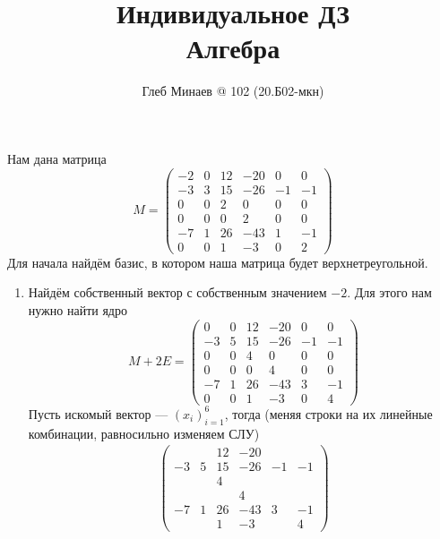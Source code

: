 \documentclass[12pt,a4paper]{article}
\title{Индивидуальное ДЗ\\Алгебра}
\author{Глеб Минаев @ 102 (20.Б02-мкн)}
\begin{document}
    \maketitle

    \begin{problem*}
        Нам дана матрица
        \[
            M =
            \begin{pmatrix}
                -2& 0& 12& -20& 0& 0\\
                -3& 3& 15& -26& -1& -1\\
                0& 0& 2& 0& 0& 0\\
                0& 0& 0& 2& 0& 0\\
                -7& 1& 26& -43& 1& -1\\
                0& 0& 1& -3& 0& 2
            \end{pmatrix}
        \]
        Для начала найдём базис, в котором наша матрица будет верхнетреугольной.
        \begin{enumerate}
            \item Найдём собственный вектор с собственным значением $-2$. Для этого нам нужно найти ядро
                \[
                    M + 2E =
                    \begin{pmatrix}
                        0& 0& 12& -20& 0& 0\\
                        -3& 5& 15& -26& -1& -1\\
                        0& 0& 4& 0& 0& 0\\
                        0& 0& 0& 4& 0& 0\\
                        -7& 1& 26& -43& 3& -1\\
                        0& 0& 1& -3& 0& 4
                    \end{pmatrix}
                \]
                Пусть искомый вектор --- $(x_i)_{i=1}^6$, тогда (меняя строки на их линейные комбинации, равносильно изменяем СЛУ)
                \begin{align*}
                    \begin{pmatrix}
                        & & 12& -20& & \\
                        -3& 5& 15& -26& -1& -1\\
                        & & 4& & & \\
                        & & & 4& & \\
                        -7& 1& 26& -43& 3& -1\\
                        & & 1& -3& & 4

\end{pmatrix}
\end{align*}
\end{enumerate}
\end{problem*}
\end{document}
